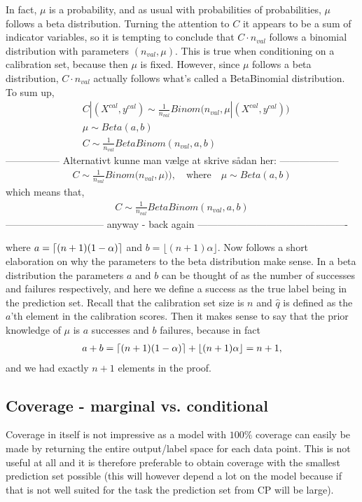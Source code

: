 In fact, $\mu$ is a probability, and as usual with probabilities of probabilities, $\mu$ follows a beta distribution. Turning the attention to $C$ it appears to be a sum of indicator variables, so it is tempting to conclude that $C\cdot n_{val}$ follows a binomial distribution with parameters $(n_{val}, \mu)$. This is true when conditioning on a calibration set, because then $\mu$ is fixed. However, since $\mu$ follows a beta distribution, $C\cdot n_{val}$ actually follows what's called a BetaBinomial distribution. To sum up,
\begin{align}
    &C|(X^{cal},y^{cal}) \sim \frac 1{n_{val}} Binom\big(n_{val},\mu |(X^{cal},y^{cal})\big)\\
    &\mu \sim Beta(a, b)\\
    &C \sim \frac 1{n_{val}} BetaBinom(n_{val}, a, b)
\end{align}
----------------- Alternativt kunne man vælge at skrive sådan her: ------------------
\begin{gather}
    C \sim \frac 1{n_{val}} Binom\big(n_{val},\mu)\big),
    \quad \text{where} \quad
    \mu \sim Beta(a, b)
\end{gather}
which means that,
\begin{gather}
    C \sim \frac 1{n_{val}} BetaBinom(n_{val}, a, b)
\end{gather}
------------------------------ anyway - back again ----------------------------------------------

where $a = \lceil {(n+1)(1-\alpha)} \rceil$ and $b=\lfloor(n+1)\alpha\rfloor$. Now follows a short elaboration on why the parameters to the beta distribution make sense. In a beta distribution the parameters $a$ and $b$ can be thought of as the number of successes and failures respectively, and here we define a success as the true label being in the prediction set. Recall that the calibration set size is $n$ and $\hat q$ is defined as the $a$'th element in the calibration scores. Then it makes sense to say that the prior knowledge of $\mu$ is $a$ successes and $b$ failures, because in fact
\begin{gather}
    a+b=\lceil {(n+1)(1-\alpha)} \rceil
    + \lfloor(n+1) \alpha\rfloor = n+1,
\end{gather}
and we had exactly $n+1$ elements in the proof.

%
%
\subsection{Coverage - marginal vs. conditional}
Coverage in itself is not impressive as a model with $100\%$ coverage can easily be made by returning the entire output/label space for each data point. This is not useful at all and it is therefore preferable to obtain coverage with the smallest prediction set possible (this will however depend a lot on the model because if that is not well suited for the task the prediction set from CP will be large). 

